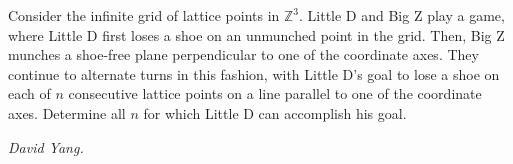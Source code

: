 Consider the infinite grid of lattice points in $\mathbb{Z}^3$. Little D and Big Z play a game, where Little D first loses a shoe on an unmunched point in the grid. Then, Big Z munches a shoe-free plane perpendicular to one of the coordinate axes. They continue to alternate turns in this fashion, with Little D's goal to lose a shoe on each of $n$ consecutive lattice points on a line parallel to one of the coordinate axes. Determine all $n$ for which Little D can accomplish his goal.

\textit{David Yang.}